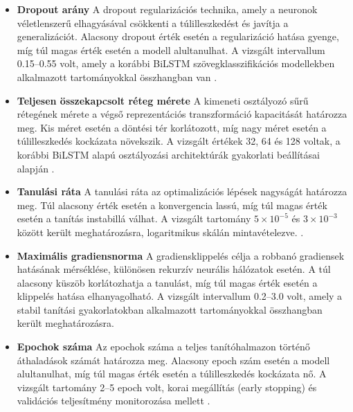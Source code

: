 \begin{itemize}
\item \textbf{Dropout arány}  
A dropout regularizációs technika, amely a neuronok véletlenszerű elhagyásával csökkenti a túlilleszkedést és javítja a generalizációt. Alacsony dropout érték esetén a regularizáció hatása gyenge, míg túl magas érték esetén a modell alultanulhat. A vizsgált intervallum 0.15–0.55 volt, amely a korábbi BiLSTM szövegklasszifikációs modellekben alkalmazott tartományokkal összhangban van \cite{mlltclassificationbilstm}.

\item \textbf{Teljesen összekapcsolt réteg mérete}  
A kimeneti osztályozó sűrű rétegének mérete a végső reprezentációs transzformáció kapacitását határozza meg. Kis méret esetén a döntési tér korlátozott, míg nagy méret esetén a túlilleszkedés kockázata növekszik. A vizsgált értékek 32, 64 és 128 voltak, a korábbi BiLSTM alapú osztályozási architektúrák gyakorlati beállításai alapján \cite{mlltclassificationbilstm}.

\item \textbf{Tanulási ráta}  
A tanulási ráta az optimalizációs lépések nagyságát határozza meg. Túl alacsony érték esetén a konvergencia lassú, míg túl magas érték esetén a tanítás instabillá válhat. A vizsgált tartomány $5 \times 10^{-5}$ és $3 \times 10^{-3}$ között került meghatározásra, logaritmikus skálán mintavételezve. \cite{goodfellow2016deepbook}.

\item \textbf{Maximális gradiensnorma}  
A gradiensklippelés célja a robbanó gradiensek hatásának mérséklése, különösen rekurzív neurális hálózatok esetén. A túl alacsony küszöb korlátozhatja a tanulást, míg túl magas érték esetén a klippelés hatása elhanyagolható. A vizsgált intervallum 0.2–3.0 volt, amely a stabil tanítási gyakorlatokban alkalmazott tartományokkal összhangban került meghatározásra.

\item \textbf{Epochok száma}  
Az epochok száma a teljes tanítóhalmazon történő áthaladások számát határozza meg. Alacsony epoch szám esetén a modell alultanulhat, míg túl magas érték esetén a túlilleszkedés kockázata nő. A vizsgált tartomány 2–5 epoch volt, korai megállítás (early stopping) és validációs teljesítmény monitorozása mellett \cite{qin2023bilstm_attention}.

\end{itemize}


